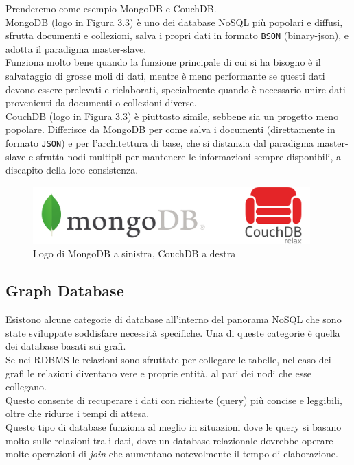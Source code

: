 \noindent Prenderemo come esempio MongoDB\cite{site:udemymongodb} e CouchDB\cite{site:udemycouchdb}.\\
MongoDB (logo in Figura 3.3) è uno dei database NoSQL più popolari e diffusi, sfrutta documenti e collezioni, salva i propri dati in formato \texttt{BSON} (binary-json), e adotta il paradigma \gls{master-slave}.\\
Funziona molto bene quando la funzione principale di cui si ha bisogno è il salvataggio di grosse moli di dati, mentre è meno performante se questi dati devono essere prelevati e rielaborati, specialmente quando è necessario unire dati provenienti da documenti o collezioni diverse.\\
CouchDB (logo in Figura 3.3) è piuttosto simile, sebbene sia un progetto meno popolare. Differisce da MongoDB per come salva i documenti (direttamente in formato \texttt{JSON}) e per l'architettura di base, che si distanzia dal paradigma \gls{master-slave} e sfrutta nodi multipli per mantenere le informazioni sempre disponibili, a discapito della loro consistenza.

\begin{figure}[htbp]
\begin{center}
\includegraphics[height=6em]{immagini/tecnologies-logos/MongoDB-CouchDB-Logo.png}
\caption{Logo di MongoDB a sinistra, CouchDB a destra}
\end{center}
\end{figure}

\subsection{Graph Database}
Esistono alcune categorie di database all'interno del panorama NoSQL che sono state sviluppate soddisfare necessità specifiche. Una di queste categorie è quella dei database basati sui grafi.\\
Se nei RDBMS le relazioni sono sfruttate per collegare le tabelle, nel caso dei grafi le relazioni diventano vere e proprie entità, al pari dei nodi che esse collegano.\\
Questo consente di recuperare i dati con richieste (query) più concise e leggibili, oltre che ridurre i tempi di attesa.\\
Questo tipo di database funziona al meglio in situazioni dove le query si basano molto sulle relazioni tra i dati, dove un database relazionale dovrebbe operare molte operazioni di \textit{join} che aumentano notevolmente il tempo di elaborazione.\\

